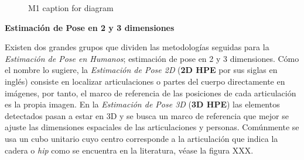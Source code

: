\begin{figure}
\begin{center}
\begin{tikzpicture}
\end{tikzpicture}
\caption{M1 caption for diagram} \label{fig:HPE-diagram}
\end{center} \end{figure}

\textbf{Estimación de Pose en 2 y 3 dimensiones}

Existen dos grandes grupos que dividen las metodologías seguidas para la \textit{Estimación de Pose en
Humanos}; estimación de pose en 2 y 3 dimensiones. Cómo el nombre lo sugiere, la \textit{Estimación
de Pose 2D} (\textbf{2D HPE} por sus siglas en inglés) consiste en localizar articulaciones o partes del cuerpo
directamente en imágenes, por tanto, el marco de referencia de las posiciones de cada articulación es la
propia imagen. En la \textit{Estimación de Pose 3D} (\textbf{3D HPE}) las elementos detectados pasan a estar en 3D
y se busca un marco de referencia que mejor se ajuste las dimensiones espaciales de las
articulaciones y personas. Comúnmente se usa un cubo unitario cuyo centro corresponde a la
articulación que indica la cadera o \textit{hip} como se encuentra en la literatura, véase la figura XXX.


